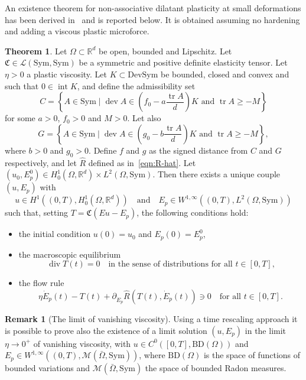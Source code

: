 \documentclass[a4paper,10pt,twoside]{amsbook}
\numberwithin{section}{chapter}
\numberwithin{equation}{chapter}
\theoremstyle{definition}
\newtheorem{thm}[prop]{Theorem}
\newtheorem{rmk}[prop]{Remark}
\DeclareMathOperator{\inter}{int}
\DeclareMathOperator{\dev}{dev}
\DeclareMathOperator{\diver}{div}
\DeclareMathOperator{\tr}{tr}
\begin{document}
An existence theorem for non-associative dilatant plasticity at small deformations has been derived in~\cite{morafrancfort} and is reported below. It is obtained assuming no hardening and adding a viscous plastic microforce.
\begin{thm}
\label{thm:existence-non-associative}
Let $\Omega\subset\mathbb{R}^d$ be open, bounded and Lipschitz. Let $\mathfrak{C}\in\mathscr{L}(\text{Sym},\text{Sym})$ be a symmetric and positive definite elasticity tensor. Let $\eta>0$ a plastic viscosity. Let $K\subset\text{DevSym}$ be bounded, closed and convex and such that $0\in\inter K$, and define the admissibility set
\[
C=\left\{A\in\text{Sym}\;|\;\text{$\dev A\in\left(f_0-a\frac{\tr A}{d}\right)K$ and $\tr A\ge-M$}\right\}
\]
for some $a>0$, $f_0>0$ and $M>0$. Let also
\[
G=\left\{A\in\text{Sym}\;|\;\text{$\dev A\in\left(g_0-b\frac{\tr A}{d}\right)K$ and $\tr A\ge-M$}\right\},
\]
where $b>0$ and $g_0>0$. Define  $f$ and $g$ as the signed distance from $C$ and $G$ respectively, and let $\hat{R}$ defined as in~\eqref{eqn:R-hat}. Let $(u_0,E_p^0)\in H^1_0(\Omega,\mathbb{R}^d)\times L^2(\Omega,\text{Sym})$. Then there exists a unique couple $(u,E_p)$ with
\[
u\in H^1((0,T),H^1_0(\Omega,\mathbb{R}^d))\quad\text{and}\quad E_p\in W^{1,\infty}((0,T),L^2(\Omega,\text{Sym}))
\]
such that, setting $T=\mathfrak{C}(Eu-E_p)$, the following conditions hold:
\begin{itemize}
\item[(i)] the initial condition $u(0)=u_0$ and $E_p(0)=E_p^0$,
\item[(ii)] the macroscopic equilibrium
\[
\diver T(t)=0\quad\text{in the sense of distributions for all $t\in[0,T]$,}
\]
\item[(iii)] the flow rule
\[
\eta\dot E_p(t)-T(t)+\partial_{\dot E_p}\hat{R}(T(t),\dot E_p(t))\ni0\quad\text{for all $t\in[0,T]$.}
\]
\end{itemize}
\end{thm}
\begin{rmk}[The limit of vanishing viscosity]
Using a time rescaling approach it is possible to prove also the existence of a limit solution $(u,E_p)$ in the limit $\eta\to0^+$ of vanishing viscosity, with $u\in C^0([0,T],\text{BD}(\Omega))$ and $E_p\in W^{1,\infty}((0,T),\mathscr{M}(\bar\Omega,\text{Sym}))$, where $\text{BD}(\Omega)$ is the space of functions of bounded variations and $\mathscr{M}(\bar\Omega,\text{Sym})$ the space of bounded Radon measures.
\end{rmk}
\end{document}

